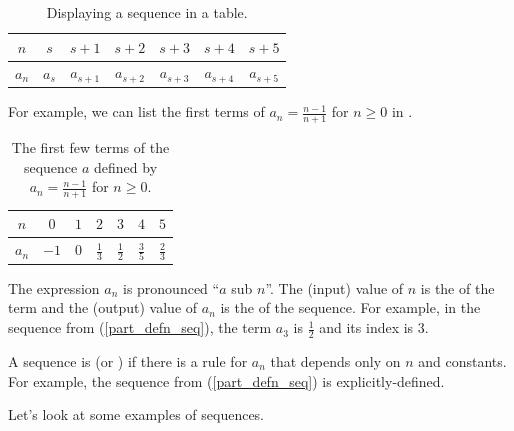 \begin{defn}[Sequence]
\begin{apart}
            \begin{table}[hbtp]
                \centering
                \begin{tabular}{c|c|c|c|c|c|c}
                    $n$ & $s$ & $s+1$ & $s+2$ & $s+3$ & $s+4$ & $s+5$ \\ \hline
                    $a_n$ & $a_s$ & $a_{s+1}$ & $a_{s+2}$ & $a_{s+3}$ & $a_{s+4}$ & $a_{s+5}$ \\
                \end{tabular}
                \caption{Displaying a sequence in a table.}
                \label{tab_seq_in_table}
            \end{table}
            
        For example, we can list the first terms of $a_n = \frac{n-1}{n+1}$ for $n \ge 0$ in .

            \begin{table}[hbtp]
                \centering
                \begin{tabular}{c|c|c|c|c|c|c}
                    $n$ & $0$ & $1$ & $2$ & $3$ & $4$ & $5$ \\ \hline
                    $a_n$ & $-1$ & $0$ & $\frac{1}{3}$ & $\frac{1}{2}$ & $\frac{3}{5}$ & $\frac{2}{3}$\\
                \end{tabular}
                \caption{The first few terms of the sequence $a$ defined by $a_n = \frac{n-1}{n+1}$ for $n \ge 0$.}
                \label{tab_seq_in_table_frac}
            \end{table}
           
        \item The expression $a_n$ is pronounced ``$a$ sub $n$''.  The (input) value of $n$ is the  of the term and the (output) value of $a_n$ is the  of the sequence.  For example, in the sequence from (\ref{part_defn_seq}), the term $a_3$ is $\frac{1}{2}$ and its index is $3$.

        \item A sequence is  (or ) if there is a rule for $a_n$ that depends only on $n$ and constants.  For example, the sequence from (\ref{part_defn_seq}) is explicitly-defined. 
    \end{apart}
\end{defn}

Let's look at some examples of sequences.

